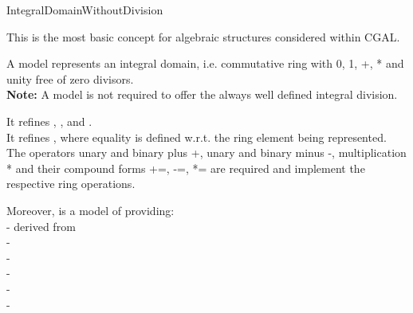 \begin{ccRefConcept}{IntegralDomainWithoutDivision}


\ccDefinition

This is the most basic concept for algebraic structures considered within CGAL. 

A model   represents an integral domain,
i.e. commutative ring with 0, 1, +, * and unity free of zero divisors.\\ 
{\bf Note:} A model is not required to offer the always well defined integral division.

It refines , , 
and . \\ 
It refines , where equality is defined w.r.t. 
the ring element being represented. \\
The operators unary and binary plus +, unary and binary minus -, 
multiplication * and their compound forms +=, -=, *= are required and 
implement the respective ring operations.

Moreover,  is a model of 
 providing:\\ 
-  derived from  \\
-   \\
-   \\
-   \\
-  \\
-  \\






\end{ccRefConcept}
